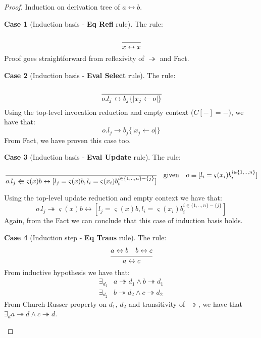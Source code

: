 \documentclass[a4paper,11pt]{article}
\theoremstyle{definition}
\newtheorem{case}{Case}
\begin{document}
\begin{proof}
 Induction on derivation tree of $a \leftrightarrow b$.
 \begin{case}[Induction basis - \textbf{Eq Refl} rule] The rule: \\
  \begin{equation*}
   \cfrac{}{x \leftrightarrow x}
  \end{equation*}
  Proof goes straightforward from reflexivity of $\twoheadrightarrow$ and Fact.
 \end{case}
 
 \begin{case}[Induction basis - \textbf{Eval Select} rule] The rule: \\
   \begin{equation*}
    \cfrac{}{o.l_j \leftrightarrow b_j\{\lvert x_j \leftarrow o \rvert \}}
   \end{equation*}
   Using the top-level invocation reduction and empty context ($C[-] = -$),
   we have that:
   \begin{equation*}
    o.l_j \rightarrow b_j\{\lvert x_j \leftarrow o \rvert \}
   \end{equation*}
   From Fact, we have proven this case too.
 \end{case}
 
 \begin{case}[Induction basis - \textbf{Eval Update} rule] The rule: \\
   \begin{equation*}
    \cfrac{}{o.l_j \Lleftarrow \varsigma(x)b \leftrightarrow [l_j = \varsigma(x)b, l_i = \varsigma(x_i)b_i^{i \in \{1,..,n\} - \{j\}}]}
    \quad \text{given} \quad o \equiv [l_i = \varsigma(x_i)b_i^{i \in \{1,..,n\}}]
   \end{equation*}
   
   Using the top-level update reduction and empty context we have that: 
   \begin{equation*}
    o.l_j \twoheadrightarrow \varsigma(x)b \leftrightarrow [l_j = \varsigma(x)b, l_i = \varsigma(x_i)b_i^{i \in \{1,..,n\} - \{j\}}]
   \end{equation*}
   Again, from the Fact we can conclude that this case of induction basis holds.
 \end{case}

 \begin{case}[Induction step - \textbf{Eq Trans} rule] The rule: \\
  \begin{equation*}
   \cfrac{a \leftrightarrow b \quad b \leftrightarrow c}{a \leftrightarrow c}
  \end{equation*}
  From inductive hypothesis we have that:
  \begin{align*}
   \exists_{d_1} & a \twoheadrightarrow d_1 \wedge b \twoheadrightarrow d_1 \\
   \exists_{d_2} & b \twoheadrightarrow d_2 \wedge c \twoheadrightarrow d_2
  \end{align*}
  From Church-Russer property on $d_1$, $d_2$ and transitivity of $\twoheadrightarrow$,
  we have that $\exists_d a \twoheadrightarrow d \wedge c \twoheadrightarrow d$.
 \end{case}
 

\end{proof}
\end{document}
